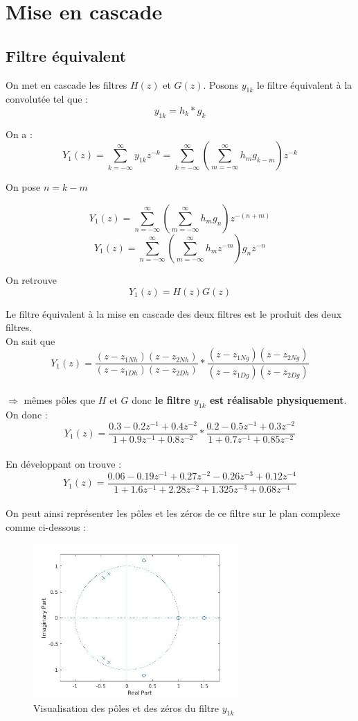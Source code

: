 \documentclass[12,french]{report}
\begin{document}
\chapter{Mise en cascade}

\section{Filtre équivalent}

On met en cascade les filtres $H(z)$ et $G(z)$. Posons $y_{1k}$ le filtre équivalent à la convolutée tel que : 
$$y_{1k}=h_k*g_k$$

On a :
$$ Y_1(z)=\sum_{k=-\infty}^{\infty}y_{1k}z^{-k}=\sum_{k=-\infty}^{\infty}\left(\sum_{m=-\infty}^{\infty}h_mg_{k-m}\right)z^{-k} $$

On pose $n=k-m$

$$ Y_1(z)=\sum_{n=-\infty}^{\infty}\left(\sum_{m=-\infty}^{\infty}h_mg_n\right)z^{-(n+m)} $$
$$ Y_1(z)=\sum_{n=-\infty}^{\infty}\left(\sum_{m=-\infty}^{\infty}h_mz^{-m}\right)g_nz^{-n} $$

On retrouve
$$ Y_1(z)=H(z)G(z) $$

Le filtre équivalent à la mise en cascade des deux filtres est le produit des deux filtres.\\

On sait que \\
$$ Y_1(z)= \frac{(z-z_{1Nh})(z-z_{2Nh})}{(z-z_{1Dh})(z-z_{2Dh})}*\frac{(z-z_{1Ng})(z-z_{2Ng})}{(z-z_{1Dg})(z-z_{2Dg})} $$\\
$\Longrightarrow$ mêmes pôles que $H$ et $G$ donc \textbf{le filtre $y_{1k}$ est réalisable physiquement}.\\

On donc :
$$Y_1(z)= \frac{0.3-0.2z^{-1}+0.4z^{-2}}{1+0.9z^{-1}+0.8z^{-2}}*\frac{0.2-0.5z^{-1}+0.3z^{-2}}{1+0.7z^{-1}+0.85z^{-2}} $$\\

En développant on trouve :
$$Y_1(z)=\frac{0.06-0.19z^{-1}+0.27z^{-2}-0.26z^{-3}+0.12z^{-4}}{1+1.6z^{-1}+2.28z^{-2}+1.325z^{-3}+0.68z^{-4}} $$\\

On peut ainsi représenter les pôles et les zéros de ce filtre sur le plan complexe comme ci-dessous :

\begin{figure}[H]
	\center
	\includegraphics[width=0.7\textwidth]{./Images/zplane_Y1}
	\caption{Visualisation des pôles et des zéros du filtre $y_{1k}$}
\end{figure}\vspace{0.2cm}
\end{document}
